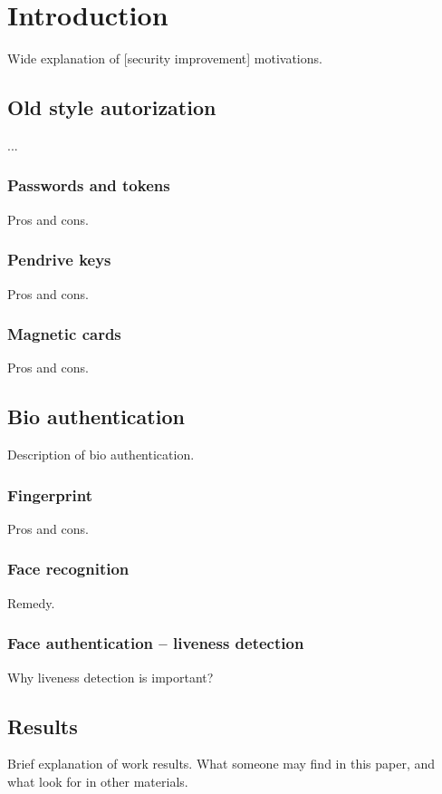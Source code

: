 \section{Introduction}
    Wide explanation of [security improvement] motivations.

    \subsection*{Old style autorization}
        ...

        \subsubsection*{Passwords and tokens}
            Pros and cons.

        \subsubsection*{Pendrive keys}
            Pros and cons.

        \subsubsection*{Magnetic cards}
            Pros and cons.

    \subsection{Bio authentication}
        Description of bio authentication.

        \subsubsection*{Fingerprint}
            Pros and cons.

        \subsubsection*{Face recognition}
            Remedy.

        \subsubsection{Face authentication -- liveness detection}
            Why liveness detection is important?

    \subsection{Results}
        Brief explanation of work results.
        What someone may find in this paper,
        and what look for in other materials.
